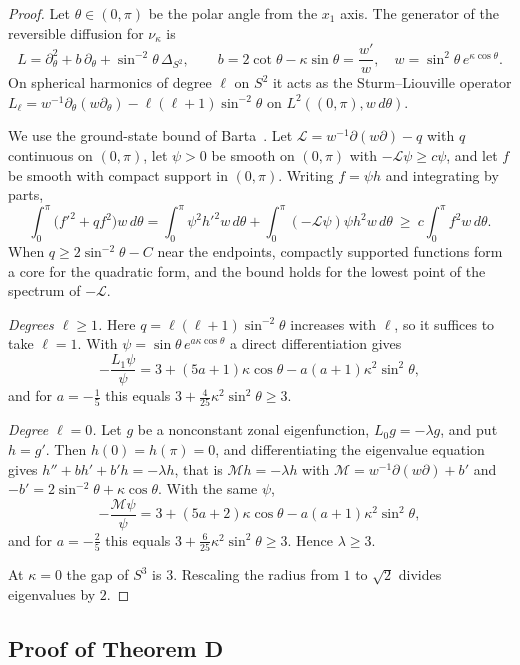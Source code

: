 \documentclass[11pt]{amsart}
\theoremstyle{definition}
\theoremstyle{remark}
\begin{document}
\begin{proof}
Let $\theta\in(0,\pi)$ be the polar angle from the $x_1$ axis. The generator of
the reversible diffusion for $\nu_\kappa$ is
\[
L=\partial_\theta^2+b\,\partial_\theta+\sin^{-2}\theta\,\Delta_{S^2},\qquad
b=2\cot\theta-\kappa\sin\theta=\frac{w'}{w},\quad w=\sin^2\theta\,
e^{\kappa\cos\theta}.
\]
On spherical harmonics of degree $\ell$ on $S^2$ it acts as the
Sturm--Liouville operator $L_\ell=w^{-1}\partial_\theta(w\partial_\theta)-
\ell(\ell+1)\sin^{-2}\theta$ on $L^2((0,\pi),w\,d\theta)$.

We use the ground-state bound of Barta~\cite{Bar37}. Let
$\mathcal L=w^{-1}\partial(w\partial)-q$ with $q$ continuous on $(0,\pi)$, let
$\psi>0$ be smooth on $(0,\pi)$ with $-\mathcal L\psi\ge c\psi$, and let $f$ be
smooth with compact support in $(0,\pi)$. Writing $f=\psi h$ and integrating
by parts,
\[
\int_0^\pi\bigl(f'^2+qf^2\bigr)w\,d\theta=\int_0^\pi\psi^2h'^2w\,d\theta
+\int_0^\pi(-\mathcal L\psi)\psi h^2w\,d\theta\ \ge\ c\int_0^\pi f^2w\,d\theta .
\]
When $q\ge 2\sin^{-2}\theta-C$ near the endpoints, compactly supported functions
form a core for the quadratic form, and the bound holds for the lowest point of
the spectrum of $-\mathcal L$.

\emph{Degrees $\ell\ge1$.} Here $q=\ell(\ell+1)\sin^{-2}\theta$ increases with
$\ell$, so it suffices to take $\ell=1$. With $\psi=\sin\theta\,
e^{a\kappa\cos\theta}$ a direct differentiation gives
\[
-\frac{L_1\psi}{\psi}=3+(5a+1)\kappa\cos\theta-a(a+1)\kappa^2\sin^2\theta,
\]
and for $a=-\frac15$ this equals $3+\frac4{25}\kappa^2\sin^2\theta\ge3$.

\emph{Degree $\ell=0$.} Let $g$ be a nonconstant zonal eigenfunction,
$L_0g=-\lambda g$, and put $h=g'$. Then $h(0)=h(\pi)=0$, and differentiating
the eigenvalue equation gives $h''+bh'+b'h=-\lambda h$, that is
$\mathcal Mh=-\lambda h$ with $\mathcal M=w^{-1}\partial(w\partial)+b'$ and
$-b'=2\sin^{-2}\theta+\kappa\cos\theta$. With the same $\psi$,
\[
-\frac{\mathcal M\psi}{\psi}=3+(5a+2)\kappa\cos\theta-a(a+1)\kappa^2
\sin^2\theta,
\]
and for $a=-\frac25$ this equals $3+\frac6{25}\kappa^2\sin^2\theta\ge3$. Hence
$\lambda\ge3$.

At $\kappa=0$ the gap of $S^3$ is $3$. Rescaling the radius from $1$ to
$\sqrt2$ divides eigenvalues by $2$.
\end{proof}

\subsection{Proof of Theorem D}
\end{document}
